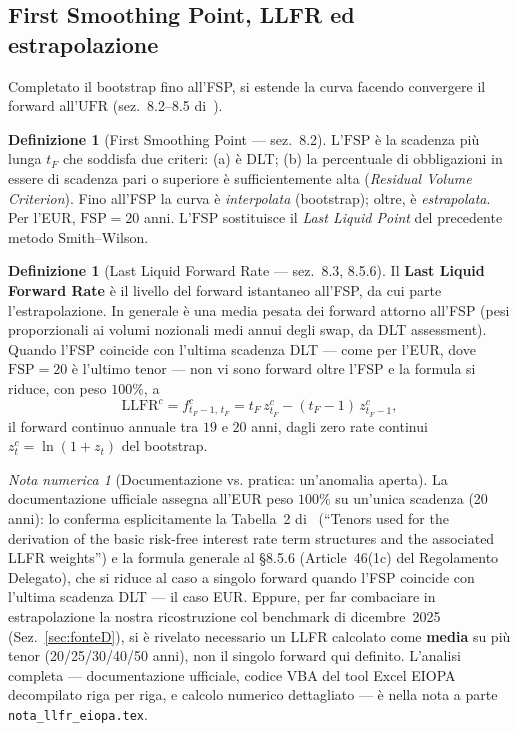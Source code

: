 \documentclass[11pt,a4paper]{article}
\theoremstyle{plain}
\theoremstyle{definition}
\newtheorem{definizione}[teorema]{Definizione}
\theoremstyle{remark}
\newtheorem*{attenzione}{Nota numerica}
\newcommand{\UFR}{\mathrm{UFR}}
\newcommand{\LLFR}{\mathrm{LLFR}}
\newcommand{\FSP}{\mathrm{FSP}}
\begin{document}
\subsection{First Smoothing Point, LLFR ed estrapolazione}
\label{sec:estrapolazione}

Completato il bootstrap fino all'FSP, si estende la curva facendo convergere il forward
all'$\UFR$ (sez.~8.2--8.5 di~\cite{eiopa2026}).

\begin{definizione}[First Smoothing Point --- sez.~8.2]
L'$\FSP$ \`e la scadenza pi\`u lunga $t_F$ che soddisfa due criteri: (a) \`e DLT; (b) la
percentuale di obbligazioni in essere di scadenza pari o superiore \`e sufficientemente alta
(\emph{Residual Volume Criterion}). Fino all'FSP la curva \`e \emph{interpolata} (bootstrap);
oltre, \`e \emph{estrapolata}. Per l'EUR, $\FSP=20$ anni. L'$\FSP$ sostituisce il
\emph{Last Liquid Point} del precedente metodo Smith--Wilson.
\end{definizione}

\begin{definizione}[Last Liquid Forward Rate --- sez.~8.3, 8.5.6]
\label{def:llfr}
Il \textbf{Last Liquid Forward Rate} \`e il livello del forward istantaneo all'FSP, da cui
parte l'estrapolazione. In generale \`e una media pesata dei forward attorno all'FSP (pesi
proporzionali ai volumi nozionali medi annui degli swap, da DLT assessment). Quando l'FSP
coincide con l'ultima scadenza DLT --- come per l'EUR, dove $\FSP=20$ \`e l'ultimo tenor ---
non vi sono forward oltre l'FSP e la formula si riduce, con peso $100\%$, a
\begin{equation}
  \label{eq:llfr}
  \LLFR^c = f^c_{t_F-1,\,t_F} = t_F\,z^c_{t_F} - (t_F-1)\,z^c_{t_F-1},
\end{equation}
il forward continuo annuale tra $19$ e $20$ anni, dagli zero rate continui $z^c_t=\ln(1+z_t)$
del bootstrap.
\end{definizione}

\begin{attenzione}[Documentazione vs. pratica: un'anomalia aperta]
La documentazione ufficiale assegna all'EUR peso $100\%$ su un'unica scadenza (20 anni): lo
conferma esplicitamente la Tabella~2 di~\cite{eiopa2026} (``Tenors used for the derivation of
the basic risk-free interest rate term structures and the associated LLFR weights'') e la
formula generale al §8.5.6 (Article~46(1c) del Regolamento Delegato), che si riduce al caso a
singolo forward quando l'FSP coincide con l'ultima scadenza DLT --- il caso EUR. Eppure, per
far combaciare in estrapolazione la nostra ricostruzione col benchmark di dicembre~2025
(Sez.~\ref{sec:fonteD}), si \`e rivelato necessario un LLFR calcolato come \textbf{media} su
pi\`u tenor (20/25/30/40/50 anni), non il singolo forward qui definito. L'analisi completa
--- documentazione ufficiale, codice VBA del tool Excel EIOPA decompilato riga per riga, e
calcolo numerico dettagliato --- \`e nella nota a parte \texttt{nota\_llfr\_eiopa.tex}.
\end{attenzione}
\end{document}
